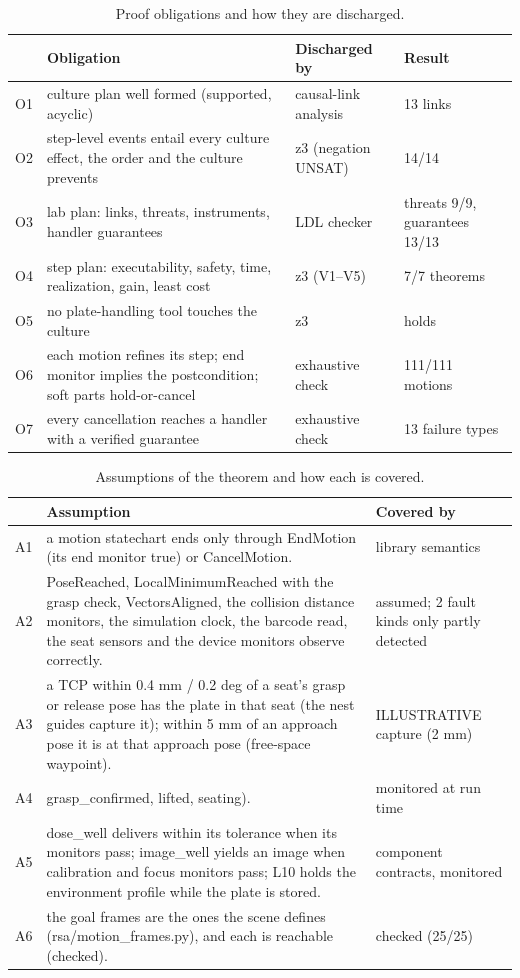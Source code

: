 \documentclass[10pt,a4paper]{article}
\begin{document}
\begin{table}[tbp]\centering\small
\caption{Proof obligations and how they are discharged.}\label{tab:obligations}
\begin{tabularx}{\linewidth}{lXll}\toprule
\textbf{} & \textbf{Obligation} & \textbf{Discharged by} & \textbf{Result} \\\midrule
O1 & culture plan well formed (supported, acyclic) & causal-link analysis & 13 links \\
O2 & step-level events entail every culture effect, the order and the culture prevents & z3 (negation UNSAT) & 14/14 \\
O3 & lab plan: links, threats, instruments, handler guarantees & LDL checker & threats 9/9, guarantees 13/13 \\
O4 & step plan: executability, safety, time, realization, gain, least cost & z3 (V1–V5) & 7/7 theorems \\
O5 & no plate-handling tool touches the culture & z3 & holds \\
O6 & each motion refines its step; end monitor implies the postcondition; soft parts hold-or-cancel & exhaustive check & 111/111 motions \\
O7 & every cancellation reaches a handler with a verified guarantee & exhaustive check & 13 failure types \\\bottomrule
\end{tabularx}
\end{table}

\begin{table}[tbp]\centering\small
\caption{Assumptions of the theorem and how each is covered.}\label{tab:assumptions}
\begin{tabularx}{\linewidth}{lXl}\toprule
\textbf{} & \textbf{Assumption} & \textbf{Covered by} \\\midrule
A1 & a motion statechart ends only through EndMotion (its end monitor true) or CancelMotion. & library semantics \\
A2 & PoseReached, LocalMinimumReached with the grasp check, VectorsAligned, the collision distance monitors, the simulation clock, the barcode read, the seat sensors and the device monitors observe correctly. & assumed; 2 fault kinds only partly detected \\
A3 & a TCP within 0.4 mm / 0.2 deg of a seat's grasp or release pose has the plate in that seat (the nest guides capture it); within 5 mm of an approach pose it is at that approach pose (free-space waypoint). & ILLUSTRATIVE capture (2 mm) \\
A4 & grasp\_confirmed, lifted, seating). & monitored at run time \\
A5 & dose\_well delivers within its tolerance when its monitors pass; image\_well yields an image when calibration and focus monitors pass; L10 holds the environment profile while the plate is stored. & component contracts, monitored \\
A6 & the goal frames are the ones the scene defines (rsa/motion\_frames.py), and each is reachable (checked).  & checked (25/25) \\\bottomrule
\end{tabularx}
\end{table}
\end{document}
